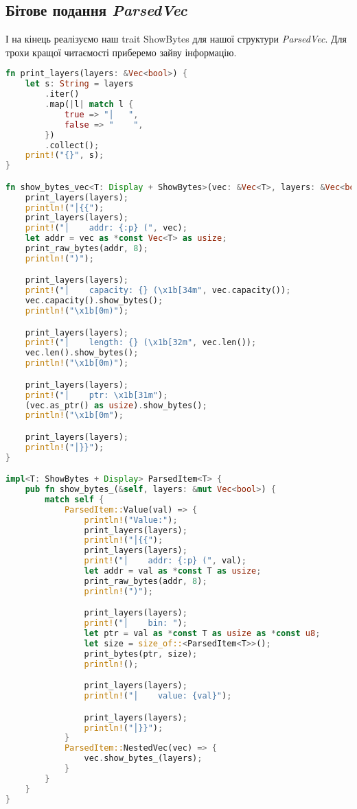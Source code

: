 \subsection{Бітове подання \textit{ParsedVec}}
І на кінець реалізуємо наш trait ShowBytes для нашої структури \textit{ParsedVec}.
Для трохи кращої читаємості приберемо зайву інформацію.
\begin{lstlisting}[language=Rust, style=colouredRust]
fn print_layers(layers: &Vec<bool>) {
    let s: String = layers
        .iter()
        .map(|l| match l {
            true => "│   ",
            false => "    ",
        })
        .collect();
    print!("{}", s);
}

fn show_bytes_vec<T: Display + ShowBytes>(vec: &Vec<T>, layers: &Vec<bool>) {
    print_layers(layers);
    println!("│{{");
    print_layers(layers);
    print!("│    addr: {:p} (", vec);
    let addr = vec as *const Vec<T> as usize;
    print_raw_bytes(addr, 8);
    println!(")");

    print_layers(layers);
    print!("│    capacity: {} (\x1b[34m", vec.capacity());
    vec.capacity().show_bytes();
    println!("\x1b[0m)");

    print_layers(layers);
    print!("│    length: {} (\x1b[32m", vec.len());
    vec.len().show_bytes();
    println!("\x1b[0m)");

    print_layers(layers);
    print!("│    ptr: \x1b[31m");
    (vec.as_ptr() as usize).show_bytes();
    println!("\x1b[0m");

    print_layers(layers);
    println!("│}}");
}

impl<T: ShowBytes + Display> ParsedItem<T> {
    pub fn show_bytes_(&self, layers: &mut Vec<bool>) {
        match self {
            ParsedItem::Value(val) => {
                println!("Value:");
                print_layers(layers);
                println!("│{{");
                print_layers(layers);
                print!("│    addr: {:p} (", val);
                let addr = val as *const T as usize;
                print_raw_bytes(addr, 8);
                println!(")");

                print_layers(layers);
                print!("│    bin: ");
                let ptr = val as *const T as usize as *const u8;
                let size = size_of::<ParsedItem<T>>();
                print_bytes(ptr, size);
                println!();

                print_layers(layers);
                println!("│    value: {val}");

                print_layers(layers);
                println!("│}}");
            }
            ParsedItem::NestedVec(vec) => {
                vec.show_bytes_(layers);
            }
        }
    }
}


\end{lstlisting}
